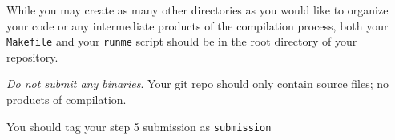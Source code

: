 \documentclass{article}
\begin{document}
	While you may create as many other directories as you would like to organize your code or any intermediate products of the compilation process, both your \texttt{Makefile} and your \texttt{runme} script should be in the root directory of your repository.

{\em Do not submit any binaries}. Your git repo should only contain source files; no products of compilation.

You should tag your step 5 submission as \texttt{submission}
\end{document}
